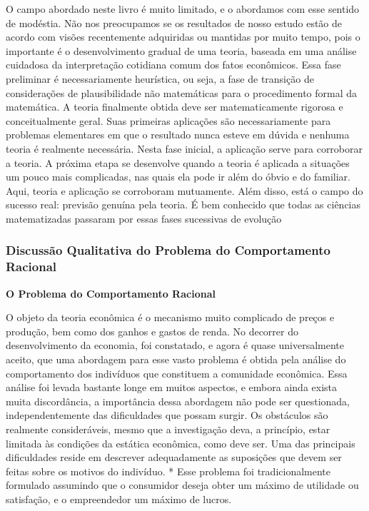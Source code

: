 \documentclass[a4paper,12pt]{article}[abntex2]
\begin{document}
O campo abordado neste livro é muito limitado, e o abordamos com esse sentido de modéstia. Não nos preocupamos se os resultados de nosso estudo estão de acordo com visões recentemente adquiridas ou mantidas por muito tempo, pois o importante é o desenvolvimento gradual de uma teoria, baseada em uma análise cuidadosa da interpretação cotidiana comum dos fatos econômicos. Essa fase preliminar é necessariamente heurística, ou seja, a fase de transição de considerações de plausibilidade não matemáticas para o procedimento formal da matemática. A teoria finalmente obtida deve ser matematicamente rigorosa e conceitualmente geral. Suas primeiras aplicações são necessariamente para problemas elementares em que o resultado nunca esteve em dúvida e nenhuma teoria é realmente necessária. Nesta fase inicial, a aplicação serve para corroborar a teoria. A próxima etapa se desenvolve quando a teoria é aplicada a situações um pouco mais complicadas, nas quais ela pode ir além do óbvio e do familiar. Aqui, teoria e aplicação se corroboram mutuamente. Além disso, está o campo do sucesso real: previsão genuína pela teoria. É bem conhecido que todas as ciências matematizadas passaram por essas fases sucessivas de evolução

\subsubsection{\textbf{Discussão Qualitativa do Problema do Comportamento Racional}}
\textbf{O Problema do Comportamento Racional}

O objeto da teoria econômica é o mecanismo muito complicado de preços e produção, bem como dos ganhos e gastos de renda. No decorrer do desenvolvimento da economia, foi constatado, e agora é quase universalmente aceito, que uma abordagem para esse vasto problema é obtida pela análise do comportamento dos indivíduos que constituem a comunidade econômica. Essa análise foi levada bastante longe em muitos aspectos, e embora ainda exista muita discordância, a importância dessa abordagem não pode ser questionada, independentemente das dificuldades que possam surgir. Os obstáculos são realmente consideráveis, mesmo que a investigação deva, a princípio, estar limitada às condições da estática econômica, como deve ser. Uma das principais dificuldades reside em descrever adequadamente as suposições que devem ser feitas sobre os motivos do indivíduo. * Esse problema foi tradicionalmente formulado assumindo que o consumidor deseja obter um máximo de utilidade ou satisfação, e o empreendedor um máximo de lucros.
\end{document}
